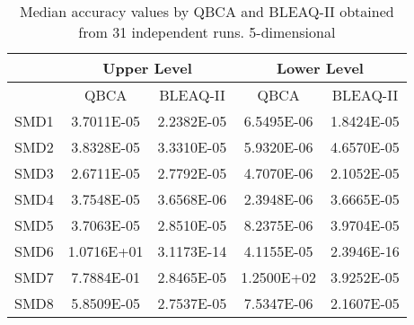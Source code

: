 \documentclass[conference]{IEEEtran}
\theoremstyle{definition}
\begin{document}
\begin{table}[t]
    \caption{Median accuracy values by QBCA and BLEAQ-II obtained from 31 independent runs. 5-dimensional}
    \label{tab:ll-comparative-vals-5}
    \centering
    \begin{tabular}{|c|c|c|c|c|}
\hline
& \multicolumn{2}{c|}{Upper Level} & \multicolumn{2}{c|}{Lower Level} \\ \hline
& QBCA & BLEAQ-II & QBCA & BLEAQ-II \\ \hline
SMD1 & 3.7011E-05 & 2.2382E-05 & 6.5495E-06 & 1.8424E-05\\ \hline 
SMD2 & 3.8328E-05 & 3.3310E-05 & 5.9320E-06 & 4.6570E-05\\ \hline 
SMD3 & 2.6711E-05 & 2.7792E-05 & 4.7070E-06 & 2.1052E-05\\ \hline 
SMD4 & 3.7548E-05 & 3.6568E-06 & 2.3948E-06 & 3.6665E-05\\ \hline 
SMD5 & 3.7063E-05 & 2.8510E-05 & 8.2375E-06 & 3.9704E-05\\ \hline 
SMD6 & 1.0716E+01 & 3.1173E-14 & 4.1155E-05 & 2.3946E-16\\ \hline 
SMD7 & 7.7884E-01 & 2.8465E-05 & 1.2500E+02 & 3.9252E-05\\ \hline 
SMD8 & 5.8509E-05 & 2.7537E-05 & 7.5347E-06 & 2.1607E-05\\ \hline 
    \end{tabular}
\end{table}

\end{document}
